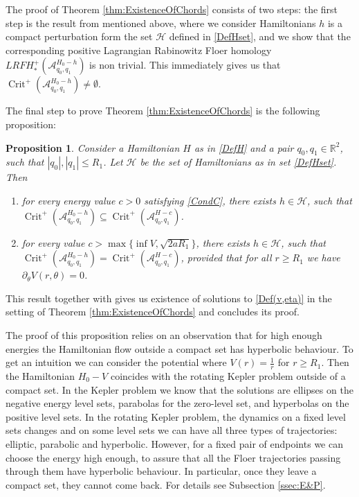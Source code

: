 \documentclass[a4paper]{amsart}
\newtheorem{prop}[thm]{Proposition}%
\numberwithin{equation}{section}
\newcommand{\R}{\mathbb{R}}
\newcommand{\A}{\mathcal{A}}
\newcommand{\Crit}{\operatorname{Crit}}
\begin{document}
The proof of Theorem \ref{thm:ExistenceOfChords} consists of two steps: the first step is the result from \cite[Thm. 1.2]{Wisniewska2024} mentioned above, where we consider Hamiltonians $h$ is a compact perturbation form the set $\mathcal{H}$ defined in \eqref{DefHset}, and we show that the corresponding positive Lagrangian Rabinowitz Floer homology $LRFH_*^+\left( \A_{q_0,q_1}^{H_0-h}\right)$ is non trivial. This immediately gives us that $\Crit^+ \left( \A_{q_0,q_1}^{H_0-h}\right)\neq \emptyset$.

The final step to prove Theorem \ref{thm:ExistenceOfChords} is the following proposition:
\begin{prop}\label{prop:chords}
Consider a Hamiltonian $H$ as in \eqref{DefH} and a pair $q_0,q_1 \in \R^2$, such that $|q_0|,|q_1|\leq R_1$. Let $\mathcal{H}$ be the set of Hamiltonians as in set \eqref{DefHset}. Then 
\begin{enumerate}[label=\arabic*.]
\item for every energy value $c>0$ satisfying \eqref{CondC}, there exists $h \in \mathcal{H}$, such that $\Crit^+ (\A^{H_0-h}_{q_0,q_1})\subseteq \Crit^+ (\A^{H-c}_{q_0,q_1})$.
\item for every value $c>\max\{\inf V, \sqrt{2aR_1}\}$, there exists $h \in \mathcal{H}$, such that $\Crit^+ (\A^{H_0-h}_{q_0,q_1})= \Crit^+ (\A^{H-c}_{q_0,q_1})$, provided that for all $r\geq R_1$ we have $\partial_\theta V(r,\theta)=0$.
\end{enumerate}
\end{prop}

This result together with \cite[Thm. 1.2]{Wisniewska2024} gives us existence of solutions to \eqref{Def(v,eta)} in the setting of Theorem \ref{thm:ExistenceOfChords} and concludes its proof.

The proof of this proposition relies on an observation that for high enough energies the Hamiltonian flow outside a compact set has hyperbolic behaviour. To get an intuition we can consider the potential where $V(r)=\frac{1}{r}$ for $r\geq R_1$. Then the Hamiltonian $H_0-V$ coincides with the rotating Kepler problem outside of a compact set. In the Kepler problem we know that the solutions are ellipses on the negative energy level sets, parabolas for the zero-level set, and hyperbolas on the positive level sets. In the rotating Kepler problem, the dynamics on a fixed level sets changes and on some level sets we can have all three types of trajectories: elliptic, parabolic and hyperbolic. However, for a fixed pair of endpoints we can choose the energy high enough, to assure that all the Floer trajectories passing through them have hyperbolic behaviour. In particular, once they leave a compact set, they cannot come back. For details see Subsection \ref{ssec:E&P}. 
\end{document}
